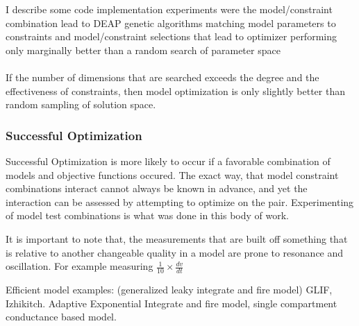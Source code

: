 
I describe some code implementation experiments were the model/constraint combination lead to DEAP genetic algorithms matching model parameters to constraints and model/constraint selections that lead to optimizer performing only marginally better than a random search of parameter space\\
\\
If the number of dimensions that are searched exceeds the degree and the effectiveness of constraints, then model optimization is only slightly better than random sampling of solution space.

\subsubsection{Successful Optimization} 
Successful Optimization is more likely to occur if a favorable combination of models and objective functions occured. 
The exact way, that model constraint combinations interact cannot always be known in advance, and yet the interaction can be assessed by attempting to optimize on the pair. Experimenting of model test combinations is what was done in this body of work.

It is important to note that, the measurements that are built off something that is relative to another changeable quality in a model are prone to resonance and oscillation. For example measuring $ \frac{1}{10} \times \frac{dv}{dt} $

Efficient model examples: (generalized leaky integrate and fire model) GLIF, Izhikitch. Adaptive Exponential Integrate and fire model, single compartment conductance based model. 

